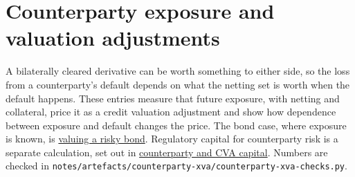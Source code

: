 \section{Counterparty exposure and valuation adjustments}

A bilaterally cleared derivative can be worth something to either side, so the loss from a counterparty's default depends on what the netting set is worth when the default happens. These entries measure that future exposure, with netting and collateral, price it as a credit valuation adjustment and show how dependence between exposure and default changes the price. The bond case, where exposure is known, is \hyperref[meth:risky-bond-cva]{valuing a risky bond}. Regulatory capital for counterparty risk is a separate calculation, set out in \hyperref[rule:counterparty-credit-cva-capital]{counterparty and CVA capital}. Numbers are checked in \texttt{notes/artefacts/counterparty-xva/counterparty-xva-checks.py}.

